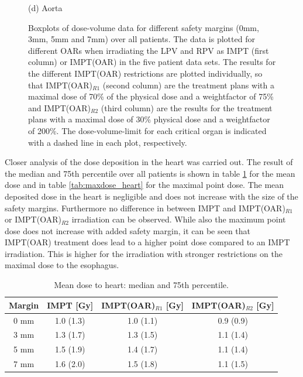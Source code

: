 \begin{figure}[H]
\begin{minipage}{0.31\textwidth}
\end{minipage}
\hfill
\begin{minipage}{\textwidth}
 \hspace*{7.5cm} (d) Aorta \\
\end{minipage}
\caption{Boxplots of dose-volume data for different safety margins (0mm, 3mm, 5mm and 7mm) over all patients. 
The data is plotted for different OARs when irradiating the LPV and RPV as IMPT (first column) or IMPT(OAR) in the five patient data sets. 
The results for the different IMPT(OAR) restrictions are plotted individually, so that IMPT(OAR)$_{R1}$ (second column) are the treatment plans 
with a maximal dose of 70\% of the physical dose and a weightfactor of 75\% and IMPT(OAR)$_{R2}$ (third column) are the results for the treatment plans 
with a maximal dose of 30\% physical dose and a weightfactor of 200\%. The dose-volume-limit for each critical organ is indicated with a 
dashed line in each plot, respectively.}
\label{margin_boxplot}
  
\end{figure}

\newpage

Closer analysis of the dose deposition in the heart was carried out. The result of the median and 75th percentile over all patients 
is shown in table \ref{tab:meandose_heart} for the mean dose and in table \ref{tab:maxdose_heart} for the maximal point dose.
The mean deposited dose in the heart is negligible and does not increase with the size of the safety margins. Furthermore no 
difference in between IMPT and IMPT(OAR)$_{R1}$ or IMPT(OAR)$_{R2}$ irradiation can be observed.  
While also the maximum point dose does not increase with added safety margin, it can be seen that IMPT(OAR) treatment does lead to a higher 
point dose compared to an IMPT irradiation. This is higher for the irradiation with stronger restrictions on the maximal dose to the 
esophagus.  


\vspace*{-0.3cm}

\begin{table}[H]
  \centering
  \footnotesize
  \caption{Mean dose to heart: median and 75th percentile.}
  \begin{tabular}{|c||c|c|c|}
    \hline\hline
      Margin & IMPT [Gy] & IMPT(OAR)$_{R1}$ [Gy] & IMPT(OAR)$_{R2}$ [Gy]\\
    \hline
    0 mm & 1.0 (1.3) & 1.0 (1.1) & 0.9 (0.9) \\
    3 mm & 1.3 (1.7) & 1.3 (1.5) & 1.1 (1.4) \\
    5 mm & 1.5 (1.9) & 1.4 (1.7) & 1.1 (1.4) \\
    7 mm & 1.6 (2.0) & 1.5 (1.8) & 1.1 (1.5) \\
    \hline\hline
  \end{tabular}
  \label{tab:meandose_heart}
\end{table}


